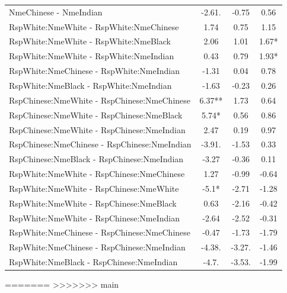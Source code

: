 \documentclass[]{report}
\begin{document}
\begin{table}
\begin{tabular}[t]{lccc}
		NmeChinese - NmeIndian & -2.61. & -0.75 & 0.56 \\ 
		RspWhite:NmeWhite - RspWhite:NmeChinese & 1.74 & 0.75 & 1.15 \\ 
		RspWhite:NmeWhite - RspWhite:NmeBlack & 2.06 & 1.01 & 1.67* \\ 
		RspWhite:NmeWhite - RspWhite:NmeIndian & 0.43 & 0.79 & 1.93* \\ 
		RspWhite:NmeChinese - RspWhite:NmeIndian & -1.31 & 0.04 & 0.78 \\ 
		RspWhite:NmeBlack - RspWhite:NmeIndian & -1.63 & -0.23 & 0.26 \\ 
		RspChinese:NmeWhite - RspChinese:NmeChinese & 6.37** & 1.73 & 0.64 \\ 
		RspChinese:NmeWhite - RspChinese:NmeBlack & 5.74* & 0.56 & 0.86 \\ 
		RspChinese:NmeWhite - RspChinese:NmeIndian & 2.47 & 0.19 & 0.97 \\ 
		RspChinese:NmeChinese - RspChinese:NmeIndian & -3.91. & -1.53 & 0.33 \\ 
		RspChinese:NmeBlack - RspChinese:NmeIndian & -3.27 & -0.36 & 0.11 \\ 
		RspWhite:NmeWhite - RspChinese:NmeChinese & 1.27 & -0.99 & -0.64 \\ 
		RspWhite:NmeWhite - RspChinese:NmeWhite & -5.1* & -2.71 & -1.28 \\ 
		RspWhite:NmeWhite - RspChinese:NmeBlack & 0.63 & -2.16 & -0.42 \\ 
		RspWhite:NmeWhite - RspChinese:NmeIndian & -2.64 & -2.52 & -0.31 \\ 
		RspWhite:NmeChinese - RspChinese:NmeChinese & -0.47 & -1.73 & -1.79 \\ 
		RspWhite:NmeChinese - RspChinese:NmeIndian & -4.38. & -3.27. & -1.46 \\ 
		RspWhite:NmeBlack - RspChinese:NmeIndian & -4.7. & -3.53. & -1.99 \\ 
		\hline
	\end{tabular}
\end{table}


=======
>>>>>>> main

\end{document}
